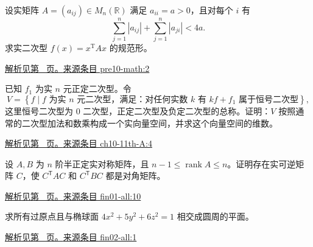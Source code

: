 \documentclass[12pt,fontset=fandol]{ctexart}
\begin{document}
\begin{example}\label{ex:pre10-math:2}

设实矩阵 $A=(a_{ij})\in M_n(\mathbb R)$ 满足 $a_{ii}=a>0$，且对每个 $i$ 有
\[
\sum_{j=1}^n|a_{ij}|+\sum_{j=1}^n|a_{ji}|<4a.
\]
求实二次型 $f(x)=x^{\mathrm T}Ax$ 的规范形。

\par\hyperref[ans:pre10-math:2]{解析见第~\pageref{ans:pre10-math:2} 页。}\quad\href{https://github.com/lzxcr/cmc-mathematics/blob/64916fa1fdbc3e444a652eca204d5669058ee321/src/problems/preliminary/10/02.md}{来源条目 pre10-math:2}

\end{example}

\begin{example}\label{ex:ch10-11th-A:4}

已知 $f_{1}$ 为实 $n$ 元正定二次型。令
\[
V=\left\{f\mid f\text{ 为实 }n\text{ 元二次型，满足：对任何实数 }k\text{ 有 }kf+f_{1}\text{ 属于恒号二次型}\right\},
\]
这里恒号二次型为 0 二次型，正定二次型及负定二次型的总称。证明：$V$ 按照通常的二次型加法和数乘构成一个实向量空间，并求这个向量空间的维数。

\par\hyperref[ans:ch10-11th-A:4]{解析见第~\pageref{ans:ch10-11th-A:4} 页。}\quad\href{https://github.com/lzxcr/cmc-mathematics/blob/64916fa1fdbc3e444a652eca204d5669058ee321/src/problems/preliminary/11/04.md}{来源条目 ch10-11th-A:4}

\end{example}

\begin{example}\label{ex:fin01-all:10}

设 $A,B$ 为 $n$ 阶半正定实对称矩阵，且 $n-1\le\operatorname{rank}A\le n$。证明存在实可逆矩阵 $C$，使 $C^{\mathsf T}AC$ 和 $C^{\mathsf T}BC$ 都是对角矩阵。

\par\hyperref[ans:fin01-all:10]{解析见第~\pageref{ans:fin01-all:10} 页。}\quad\href{https://github.com/lzxcr/cmc-mathematics/blob/64916fa1fdbc3e444a652eca204d5669058ee321/src/problems/finals/01/10.md}{来源条目 fin01-all:10}

\end{example}

\begin{example}\label{ex:fin02-all:1}

求所有过原点且与椭球面 $4x^2+5y^2+6z^2=1$ 相交成圆周的平面。

\par\hyperref[ans:fin02-all:1]{解析见第~\pageref{ans:fin02-all:1} 页。}\quad\href{https://github.com/lzxcr/cmc-mathematics/blob/64916fa1fdbc3e444a652eca204d5669058ee321/src/problems/finals/02/01.md}{来源条目 fin02-all:1}

\end{example}
\end{document}
